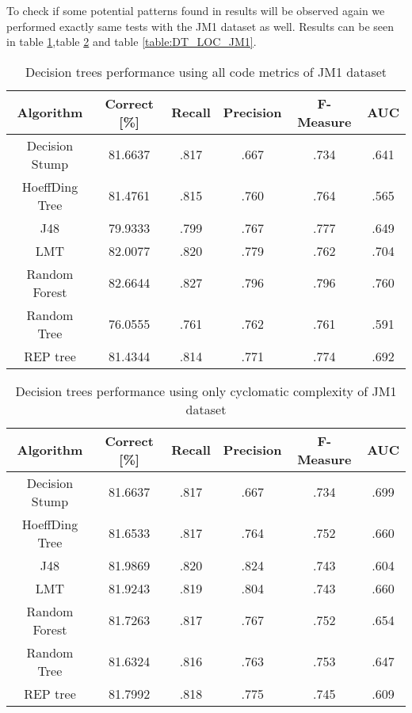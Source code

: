 To check if some potential patterns found in results will be observed again we performed exactly same tests with the JM1 dataset as well. Results can be seen in table \ref{table:DT_allMetrics_JM1},table \ref{table:DT_complexity_JM1} and table \ref{table:DT_LOC_JM1}.

\begin{table}[h!]
\centering
\begin{tabular}{ |c|c|c|c|c|c| } 
 \hline
 \textbf{Algorithm} & \textbf{Correct [\%]} & \textbf{Recall} & \textbf{Precision} & \textbf{F-Measure} & \textbf{AUC}  \\ 
 \hline
 Decision Stump & 81.6637 & .817 & .667 & .734 & .641   \\ 
 \hline
 HoeffDing Tree & 81.4761 & .815 & .760 & .764 & .565   \\ 
 \hline
  J48 & 79.9333 & .799 & .767 & .777 & .649   \\ 
 \hline
  LMT & 82.0077 & .820 & .779 & .762 & .704    \\ 
 \hline
  Random Forest & \textcolor{myRed}{82.6644} & \textcolor{myRed}{.827} & \textcolor{myRed}{.796} & \textcolor{myRed}{.796} & \textcolor{myRed}{.760}   \\ 
 \hline
  Random Tree & 76.0555 & .761 & .762 & .761 & .591   \\ 
 \hline
 REP tree  & 81.4344 & .814 & .771 & .774 & .692   \\ 
 \hline
\end{tabular}
\caption{Decision trees performance using all code metrics of JM1 dataset}
\label{table:DT_allMetrics_JM1}
\end{table}

\begin{table}[h!]
\centering
\begin{tabular}{ |c|c|c|c|c|c| } 
 \hline
 \textbf{Algorithm} & \textbf{Correct [\%]} & \textbf{Recall} & \textbf{Precision} & \textbf{F-Measure} & \textbf{AUC}  \\ 
 \hline
 Decision Stump & 81.6637 & .817 & .667 & .734 & \textcolor{myRed}{.699}   \\ 
 \hline
 HoeffDing Tree & 81.6533 & .817 & .764 & .752 & .660   \\ 
 \hline
  J48 & \textcolor{myRed}{81.9869} & \textcolor{myRed}{.820} & \textcolor{myRed}{.824} & .743 & .604   \\ 
 \hline
  LMT & 81.9243 & .819 & .804 & .743 & .660    \\ 
 \hline
  Random Forest & 81.7263 & .817 & .767 & .752 & .654   \\ 
 \hline
 Random Tree  & 81.6324 & .816 & .763 & \textcolor{myRed}{.753} & .647   \\ 
 \hline
 REP tree & 81.7992 & .818 & .775 & .745 & .609   \\ 
 \hline
\end{tabular}
\caption{Decision trees performance using only cyclomatic complexity of JM1 dataset}
\label{table:DT_complexity_JM1}
\end{table}


